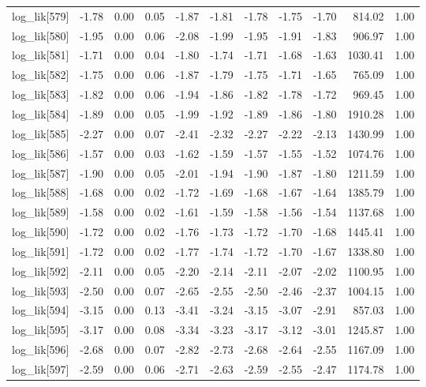 \begin{table}[ht]
\begin{tabular}{rrrrrrrrrrr}
  log\_lik[579] & -1.78 & 0.00 & 0.05 & -1.87 & -1.81 & -1.78 & -1.75 & -1.70 & 814.02 & 1.00 \\ 
  log\_lik[580] & -1.95 & 0.00 & 0.06 & -2.08 & -1.99 & -1.95 & -1.91 & -1.83 & 906.97 & 1.00 \\ 
  log\_lik[581] & -1.71 & 0.00 & 0.04 & -1.80 & -1.74 & -1.71 & -1.68 & -1.63 & 1030.41 & 1.00 \\ 
  log\_lik[582] & -1.75 & 0.00 & 0.06 & -1.87 & -1.79 & -1.75 & -1.71 & -1.65 & 765.09 & 1.00 \\ 
  log\_lik[583] & -1.82 & 0.00 & 0.06 & -1.94 & -1.86 & -1.82 & -1.78 & -1.72 & 969.45 & 1.00 \\ 
  log\_lik[584] & -1.89 & 0.00 & 0.05 & -1.99 & -1.92 & -1.89 & -1.86 & -1.80 & 1910.28 & 1.00 \\ 
  log\_lik[585] & -2.27 & 0.00 & 0.07 & -2.41 & -2.32 & -2.27 & -2.22 & -2.13 & 1430.99 & 1.00 \\ 
  log\_lik[586] & -1.57 & 0.00 & 0.03 & -1.62 & -1.59 & -1.57 & -1.55 & -1.52 & 1074.76 & 1.00 \\ 
  log\_lik[587] & -1.90 & 0.00 & 0.05 & -2.01 & -1.94 & -1.90 & -1.87 & -1.80 & 1211.59 & 1.00 \\ 
  log\_lik[588] & -1.68 & 0.00 & 0.02 & -1.72 & -1.69 & -1.68 & -1.67 & -1.64 & 1385.79 & 1.00 \\ 
  log\_lik[589] & -1.58 & 0.00 & 0.02 & -1.61 & -1.59 & -1.58 & -1.56 & -1.54 & 1137.68 & 1.00 \\ 
  log\_lik[590] & -1.72 & 0.00 & 0.02 & -1.76 & -1.73 & -1.72 & -1.70 & -1.68 & 1445.41 & 1.00 \\ 
  log\_lik[591] & -1.72 & 0.00 & 0.02 & -1.77 & -1.74 & -1.72 & -1.70 & -1.67 & 1338.80 & 1.00 \\ 
  log\_lik[592] & -2.11 & 0.00 & 0.05 & -2.20 & -2.14 & -2.11 & -2.07 & -2.02 & 1100.95 & 1.00 \\ 
  log\_lik[593] & -2.50 & 0.00 & 0.07 & -2.65 & -2.55 & -2.50 & -2.46 & -2.37 & 1004.15 & 1.00 \\ 
  log\_lik[594] & -3.15 & 0.00 & 0.13 & -3.41 & -3.24 & -3.15 & -3.07 & -2.91 & 857.03 & 1.00 \\ 
  log\_lik[595] & -3.17 & 0.00 & 0.08 & -3.34 & -3.23 & -3.17 & -3.12 & -3.01 & 1245.87 & 1.00 \\ 
  log\_lik[596] & -2.68 & 0.00 & 0.07 & -2.82 & -2.73 & -2.68 & -2.64 & -2.55 & 1167.09 & 1.00 \\ 
  log\_lik[597] & -2.59 & 0.00 & 0.06 & -2.71 & -2.63 & -2.59 & -2.55 & -2.47 & 1174.78 & 1.00 \\ 

\end{tabular}
\end{table}
